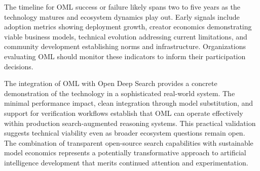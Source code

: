 The timeline for OML success or failure likely spans two to five years as the technology matures and ecosystem dynamics play out. Early signals include adoption metrics showing deployment growth, creator economics demonstrating viable business models, technical evolution addressing current limitations, and community development establishing norms and infrastructure. Organizations evaluating OML should monitor these indicators to inform their participation decisions.

The integration of OML with Open Deep Search provides a concrete demonstration of the technology in a sophisticated real-world system. The minimal performance impact, clean integration through model substitution, and support for verification workflows establish that OML can operate effectively within production search-augmented reasoning systems. This practical validation suggests technical viability even as broader ecosystem questions remain open. The combination of transparent open-source search capabilities with sustainable model economics represents a potentially transformative approach to artificial intelligence development that merits continued attention and experimentation.

